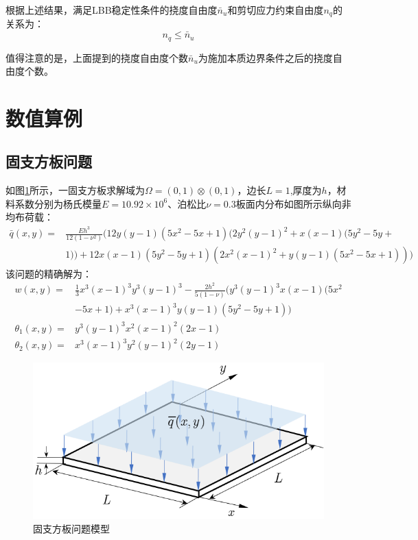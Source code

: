 根据上述结果，满足LBB稳定性条件的挠度自由度$\bar{n}_u$和剪切应力约束自由度$n_q$的关系为：
\begin{equation}\label{ch_5:eq:best}
    n_q\leq \bar{n}_u
\end{equation}

值得注意的是，上面提到的挠度自由度个数$\bar{n}_u$为施加本质边界条件之后的挠度自由度个数。
\section{数值算例}

\subsection{固支方板问题}
如图\ref{ch_5:fig:plate}所示，一固支方板求解域为$\Omega=(0,1)\otimes(0,1)$，边长$L=1$,厚度为$h$，材料系数分别为杨氏模量$E=10.92\times10^6$、泊松比$\nu=0.3$板面内分布如图所示纵向非均布荷载：
\begin{equation} 
\begin{split} 
    \bar{q}(x,y) =&\frac{Eh^3}{12(1-\nu^2)}(12y(y-1)(5x^2-5x+1)(2y^2(y-1)^2+x(x-1)(5y^2-5y+\\
    &1))+12x(x-1)(5y^2-5y+1)(2x^2(x-1)^2+y(y-1)(5x^2-5x+1)))
\end{split} 
\end{equation}
该问题的精确解为：
\begin{equation} 
    \begin{split} 
        w(x,y) =&\frac{1}{3}x^3(x-1)^3y^3(y-1)^3-\frac{2h^2}{5(1-\nu)}(y^3(y-1)^3x(x-1)(5x^2\\
        &-5x+1)+x^3(x-1)^3y(y-1)(5y^2-5y+1))\\
        \theta_1(x,y) =& y^3(y-1)^3x^2(x-1)^2(2x-1)\\
        \theta_2(x,y) =& x^3(x-1)^3y^2(y-1)^2(2y-1)
    \end{split}  
\end{equation}
\begin{figure}[H]
    \centering 
        \includegraphics[scale=0.8]{figures/ch_5/plate.png}
        \caption{固支方板问题模型}\label{ch_5:fig:plate}
\end{figure}

